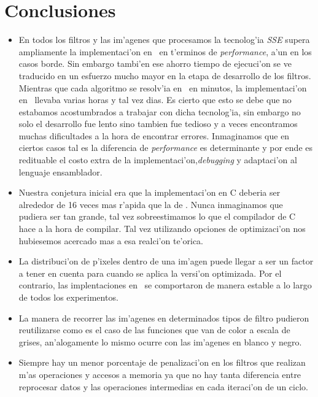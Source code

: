 \section{Conclusiones}
\label{sec:conclusiones}
\begin{itemize}
\item En todos los filtros y las im'agenes que procesamos la tecnolog'ia \textit{SSE} supera ampliamente la implementaci'on en \C \ en t'erminos de \textit{performance}, a'un en los casos borde. Sin embargo tambi'en ese ahorro tiempo de ejecuci'on se ve traducido en un esfuerzo mucho mayor en la etapa de desarrollo de los filtros. Mientras que cada algoritmo se resolv'ia en \C\ en minutos, la implementaci'on en \ass\ llevaba varias horas y tal vez dias. Es cierto que esto se debe que no estabamos acostumbrados a trabajar con dicha tecnolog'ia, sin embargo no solo el desarrollo fue lento sino tambien fue tedioso y a veces encontramos muchas dificultades a la hora de encontrar errores. Inmaginamos que en ciertos casos tal es la diferencia de \textit{performance} es determinante y por ende es redituable el costo extra de la implementaci'on,\textit{debugging} y adaptaci'on al lenguaje ensamblador.

\item Nuestra conjetura inicial era que la implementaci'on en C deberia ser alrededor de 16 veces mas r'apida que la de \ass. Nunca inmaginamos que pudiera ser tan grande, tal vez sobreestimamos lo que el compilador de C hace a la hora de compilar. Tal vez utilizando opciones de optimizaci'on nos hubiesemos acercado mas a esa realci'on te'orica.

\item La distribuci'on de p'ixeles dentro de una im'agen puede llegar a ser un factor a tener en cuenta para cuando se aplica la versi'on optimizada. Por el contrario, las implentaciones en \C\ se comportaron de manera estable a lo largo de todos los experimentos.

\item La manera de recorrer las im'agenes en determinados tipos de filtro pudieron reutilizarse como es el caso de las funciones que van de color 
a escala de grises, an'alogamente lo mismo ocurre con las im'agenes en blanco y negro.

\item Siempre hay un menor porcentaje de penalizaci'on en los filtros que realizan m'as operaciones y accesos a memoria ya que 
no hay tanta diferencia entre reprocesar datos y las operaciones intermedias en cada iteraci'on de un ciclo.


\end{itemize}
